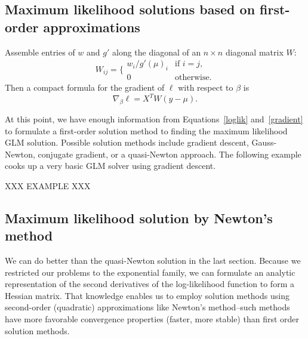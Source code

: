 \documentclass[10pt]{article} %
\begin{document}
\subsection*{Maximum likelihood solutions based on first-order approximations}

Assemble entries of $w$ and $g'$ along the diagonal of an
$n\times n$ diagonal matrix $W$:
\begin{equation}\label{W}
W_{ij} = \bigg\{\begin{array}{cr}
w_i / g'(\mu)_i & \mbox{if $i=j$}, \\
0 & \mbox{otherwise}.
\end{array}
\end{equation}
Then a compact formula for the gradient of $\ell$ with respect to $\beta$ is
\begin{equation}\label{gradient}
\nabla_\beta\ell = X^TW(y - \mu).
\end{equation}

At this point, we have enough information from Equations~\ref{loglik}
and~\ref{gradient} to formulate a first-order solution method to finding the
maximum likelihood GLM solution.  Possible solution methods include gradient
descent, Gauss-Newton, conjugate gradient, or a quasi-Newton approach.
The following example cooks up a very basic GLM solver using gradient
descent.

XXX EXAMPLE XXX



\subsection*{Maximum likelihood solution by Newton's method}

We can do better than the quasi-Newton solution in the last section.  Because
we restricted our problems to the exponential family, we can formulate an
analytic representation of the second derivatives of the log-likelihood
function to form a Hessian matrix. That knowledge enables us to employ solution
methods using second-order (quadratic) approximations like Newton's
method--such methods have more favorable convergence properties (faster, more
stable) than first order solution methods.
\end{document}
